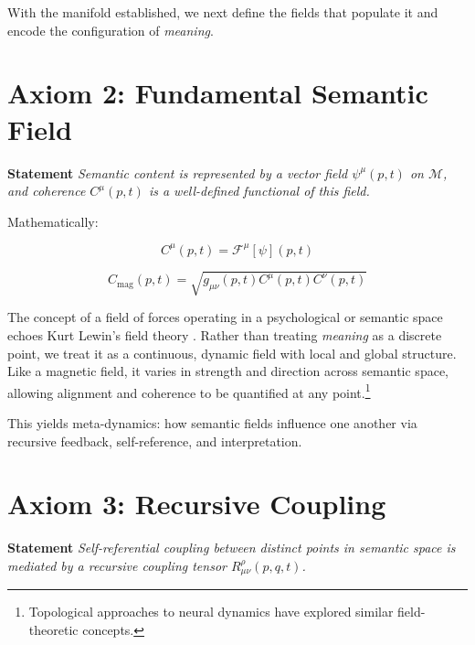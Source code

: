 With the manifold established, we next define the fields that populate it and encode the configuration of \textit{meaning}.


\section{Axiom 2: Fundamental Semantic Field}
\label{1.2:axiom_2_fundamental_semantic_field}

\textbf{Statement} \textit{Semantic content is represented by a vector field \(\psi^\mu(p,t)\) on \(\mathcal{M}\), and coherence \(C^\mu(p,t)\) is a well-defined functional of this field.}

Mathematically:

\begin{equation}
C^\mu(p,t) = \mathcal{F}^\mu[\psi](p,t)
\end{equation}

\begin{equation}
C_{\text{mag}}(p,t) = \sqrt{g_{\mu\nu}(p,t) C^\mu(p,t) C^\nu(p,t)}
\end{equation}

The concept of a field of forces operating in a psychological or semantic space echoes Kurt Lewin's field theory \autocite{Lewin1951}. Rather than treating \textit{meaning} as a discrete point, we treat it as a continuous, dynamic field with local and global structure. Like a magnetic field, it varies in strength and direction across semantic space, allowing alignment and coherence to be quantified at any point.\footnote{Topological approaches to neural dynamics \autocite{Bassett2018, Petri2014} have explored similar field-theoretic concepts.}

This yields meta-dynamics: how semantic fields influence one another via recursive feedback, self-reference, and interpretation.


\section{Axiom 3: Recursive Coupling}
\label{1.3:axiom_3_recursive_coupling}

\textbf{Statement} \textit{Self-referential coupling between distinct points in semantic space is mediated by a recursive coupling tensor \(R^\rho_{\mu\nu}(p,q,t)\).}

